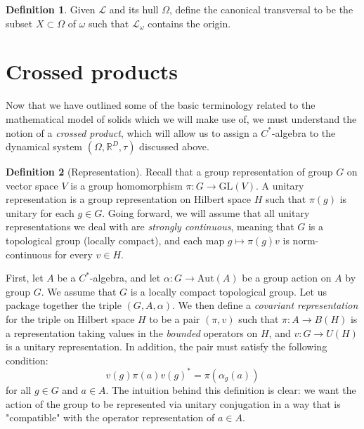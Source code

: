\documentclass[aps,pra,showpacs,notitlepage,onecolumn,superscriptaddress,nofootinbib]{revtex4-1}
\theoremstyle{definition}
\newtheorem{definition}{Definition}[section]
\begin{document}
\begin{definition}
    Given $\mathcal{L}$ and its hull $\Omega$, define the canonical transversal to be the subset $X \subset \Omega$ of $\omega$ such that $\mathcal{L}_{\omega}$ contains the origin.
\end{definition}

\section{Crossed products}

Now that we have outlined some of the basic terminology related to the mathematical model of solids which we will make use of, we must understand the notion of a \emph{crossed product}, which will allow us to assign a $C^{*}$-algebra to the dynamical system $(\Omega, \mathbb{R}^{D}, \tau)$ discussed above.

\begin{definition}[Representation]
    Recall that a group representation of group $G$ on vector space $V$ is a group homomorphism  $\pi : G \rightarrow \text{GL}(V)$. A unitary representation is a group representation on Hilbert space $H$ such that $\pi(g)$ is unitary for each $g \in G$. Going forward, we will assume that all unitary representations we deal with are \emph{strongly continuous}, meaning that $G$ is a topological group (locally compact), and each map $g \mapsto \pi(g) v$ is norm-continuous for every $v \in H$.
\end{definition}

First, let $A$ be a $C^*$-algebra, and let $\alpha : G \rightarrow \text{Aut}(A)$ be a group action on $A$ by group $G$. We assume that $G$ is a locally compact topological group. Let us package together the triple $(G, A, \alpha)$. We then define a \emph{covariant representation} for the triple on Hilbert space $H$ to be a pair $(\pi, v)$ such that $\pi : A \rightarrow B(H)$ is a representation taking values in the \emph{bounded} operators on $H$, and $v : G \rightarrow U(H)$ is a unitary representation. In addition, the pair must satisfy the following condition:
\begin{equation}
    v(g) \pi(a) v(g)^{*} = \pi(\alpha_g(a))
\end{equation}
for all $g \in G$ and $a \in A$. The intuition behind this definition is clear: we want the action of the group to be represented via unitary conjugation in a way that is "compatible" with the operator representation of $a \in A$.
\end{document}
